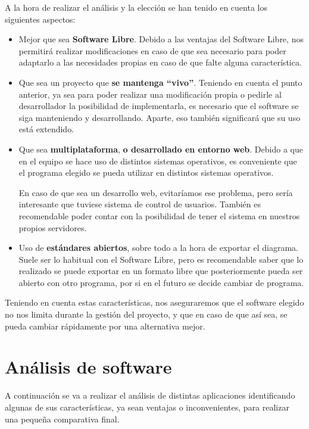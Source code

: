 \documentclass{\ClassPath/viu-tfm-template}
\begin{document}
A la hora de realizar el análisis y la elección se han tenido en cuenta los siguientes aspectos:
\begin{itemize}
    \item Mejor que sea \textbf{Software Libre}. Debido a las ventajas del Software Libre, nos permitirá realizar modificaciones en caso de que sea necesario para poder adaptarlo a las necesidades propias en caso de que falte alguna característica.

    \item Que sea un proyecto que \textbf{se mantenga “vivo”}. Teniendo en cuenta el punto anterior, ya sea para poder realizar una modificación propia o pedirle al desarrollador la posibilidad de implementarla, es necesario que el software se siga manteniendo y desarrollando. Aparte, eso también significará que su uso está extendido.
    \item Que sea \textbf{multiplataforma}, \textbf{o desarrollado en entorno web}. Debido a que en el equipo se hace uso de distintos sistemas operativos, es conveniente que el programa elegido se pueda utilizar en distintos sistemas operativos.

    En caso de que sea un desarrollo web, evitaríamos ese problema, pero sería interesante que tuviese sistema de control de usuarios. También es recomendable poder contar con la posibilidad de tener el sistema en nuestros propios servidores.

    \item Uso de \textbf{estándares abiertos}, sobre todo a la hora de exportar el diagrama. Suele ser lo habitual con el Software Libre, pero es recomendable saber que lo realizado se puede exportar en un formato libre que posteriormente pueda ser abierto con otro programa, por si en el futuro se decide cambiar de programa.
\end{itemize}

Teniendo en cuenta estas características, nos aseguraremos que el software elegido no nos limita durante la gestión del proyecto, y que en caso de que así sea, se pueda cambiar rápidamente por una alternativa mejor.


\section{Análisis de software}

A continuación se va a realizar el análisis de distintas aplicaciones identificando algunas de sus características, ya sean ventajas o inconvenientes, para realizar una pequeña comparativa final.
\end{document}
